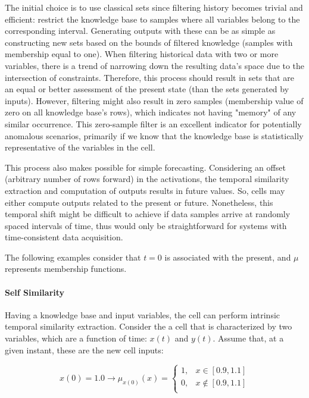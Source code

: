 The initial choice is to use classical sets since filtering history becomes trivial and efficient: restrict the knowledge base to samples where all variables belong to the corresponding interval. Generating outputs with these can be as simple as constructing new sets based on the bounds of filtered knowledge (samples with membership equal to one). When filtering historical data with two or more variables, there is a trend of narrowing down the resulting data's space due to the intersection of constraints. Therefore, this process should result in sets that are an equal or better assessment of the present state (than the sets generated by inputs). However, filtering might also result in zero samples (membership value of zero on all knowledge base's rows), which indicates not having "memory" of any similar occurrence. This zero-sample filter is an excellent indicator for potentially anomalous scenarios, primarily if we know that the knowledge base is statistically representative of the variables in the cell.

This process also makes possible for simple forecasting. Considering an offset (arbitrary number of rows forward) in the activations, the temporal similarity extraction and computation of outputs results in future values. So, cells may either compute outputs related to the present or future. Nonetheless, this temporal shift might be difficult to achieve if data samples arrive at randomly spaced intervals of time, thus would only be straightforward for systems with time-consistent data acquisition.

The following examples consider that $t=0$ is associated with the present, and $\mu$ represents membership functions.

\paragraph{Self Similarity}
Having a knowledge base and input variables, the cell can perform intrinsic temporal similarity extraction.
Consider the a cell that is characterized by two variables, which are a function of time: $x(t)$ and $y(t)$.
Assume that, at a given instant, these are the new cell inputs:

\begin{equation}
    x(0) = 1.0 \rightarrow \mu_{x(0)}(x) =
    \begin{cases}
        1, & x \in [0.9, 1.1]    \\
        0, & x \notin [0.9, 1.1] \\
    \end{cases}
\end{equation}

